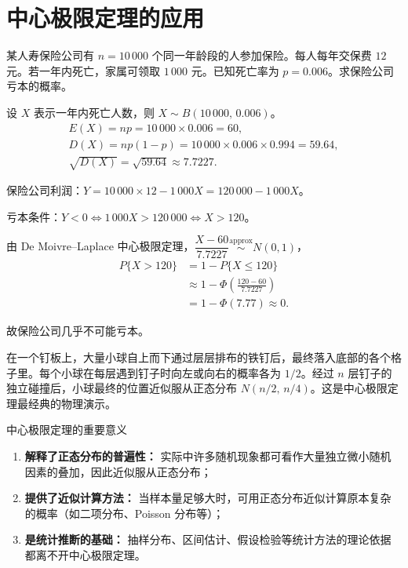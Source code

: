 \section{中心极限定理的应用}

\begin{example}[保险公司亏本概率]
某人寿保险公司有 $n = 10\,000$ 个同一年龄段的人参加保险。每人每年交保费 $12$ 元。若一年内死亡，家属可领取 $1\,000$ 元。已知死亡率为 $p = 0.006$。求保险公司亏本的概率。

\begin{solution}
设 $X$ 表示一年内死亡人数，则 $X \sim B(10\,000,\, 0.006)$。
\begin{gather*}
E(X) = np = 10\,000 \times 0.006 = 60,\\
D(X) = np(1-p) = 10\,000 \times 0.006 \times 0.994 = 59.64,\\
\sqrt{D(X)} = \sqrt{59.64} \approx 7.7227.
\end{gather*}

保险公司利润：$Y = 10\,000 \times 12 - 1\,000 X = 120\,000 - 1\,000 X$。

亏本条件：$Y < 0 \iff 1\,000 X > 120\,000 \iff X > 120$。

由 De Moivre--Laplace 中心极限定理，$\dfrac{X - 60}{7.7227} \stackrel{\text{approx}}{\sim} N(0, 1)$，
\begin{align*}
P\{X > 120\} &= 1 - P\{X \leq 120\} \\
&\approx 1 - \Phi\!\left(\frac{120 - 60}{7.7227}\right) \\
&= 1 - \Phi(7.77) \approx 0.
\end{align*}

故保险公司几乎不可能亏本。
\end{solution}
\end{example}

\begin{example}[高尔顿钉板实验]
在一个钉板上，大量小球自上而下通过层层排布的铁钉后，最终落入底部的各个格子里。每个小球在每层遇到钉子时向左或向右的概率各为 $1/2$。经过 $n$ 层钉子的独立碰撞后，小球最终的位置近似服从正态分布 $N(n/2,\, n/4)$。这是中心极限定理最经典的物理演示。
\end{example}

\begin{myTheorem}{中心极限定理的重要意义}
\begin{enumerate}
	\item \textbf{解释了正态分布的普遍性：} 实际中许多随机现象都可看作大量独立微小随机因素的叠加，因此近似服从正态分布；
	\item \textbf{提供了近似计算方法：} 当样本量足够大时，可用正态分布近似计算原本复杂的概率（如二项分布、Poisson 分布等）；
	\item \textbf{是统计推断的基础：} 抽样分布、区间估计、假设检验等统计方法的理论依据都离不开中心极限定理。
\end{enumerate}
\end{myTheorem}

